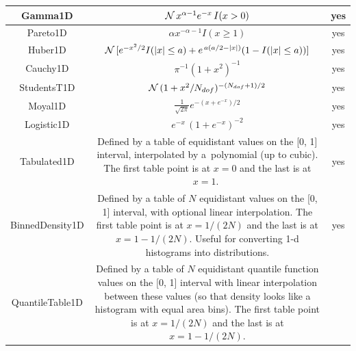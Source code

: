 \documentclass[12pt,titlepage]{article}
\newcommand{\cname}[1]{\index{#1}\textsf{#1}}
\begin{document}
\begin{longtable}{|c|c|c|}
\cname{Gamma1D} & ${\cal{N}} \, x^{\alpha - 1} e^{-x} \, I(x > 0)$ & yes \\ \hline
\cname{Pareto1D} & $\alpha x^{-\alpha - 1} I(x \ge 1)$ & yes \\ \hline
\cname{Huber1D} & ${\cal{N}} \, [e^{-x^2/2} I(|x| \le a) + e^{\, a (a/2 - |x|)} (1 - I(|x| \le a))] $ & yes \\ \hline
\cname{Cauchy1D} & $\pi^{-1} (1 + x^2)^{-1}$ & yes \\ \hline
\cname{StudentsT1D} & ${\cal{N}} \, (1 + x^2/N_{dof})^{-(N_{dof} + 1)/2}$ & yes \\ \hline
\cname{Moyal1D} & $\frac{1}{\sqrt{2 \pi}} e^{-(x + e^{-x})/2}$ & yes \\ \hline
\cname{Logistic1D} & $e^{-x} \,(1 + e^{-x})^{-2}$ & yes \\ \hline
\cname{Tabulated1D} & \begin{minipage}{0.52\linewidth}
                      \vskip1mm
                      Defined by a table of equidistant values on
                      the [0, 1] interval, interpolated by 
                      a~polynomial (up to cubic). The first table
                      point is at $x = 0$ and the last is at $x = 1$. \newline \vskip-8mm $\mbox{}$
                      \end{minipage} & yes \\ \hline
\cname{BinnedDensity1D} & \begin{minipage}{0.52\linewidth}
                      \vskip1mm
                      Defined by a table of $N$ equidistant values
                      on the [0, 1] interval, with optional linear
                      interpolation. The first table point is at
                      $x = 1/(2 N)$ and the last is at $x = 1 - 1/(2 N)$.
                      Useful for converting 1-d histograms into distributions.
                      \end{minipage} & yes \\ \hline
\cname{QuantileTable1D} & \begin{minipage}{0.52\linewidth}
                      \vskip1mm
                      Defined by a table of $N$ equidistant quantile function values
                      on the [0, 1] interval with linear interpolation between these values
                      (so that density looks like a histogram with equal area bins).
                      The first table point is at
                      $x = 1/(2 N)$ and the last is at $x = 1 - 1/(2 N)$.

\end{minipage}
\end{longtable}
\end{document}
